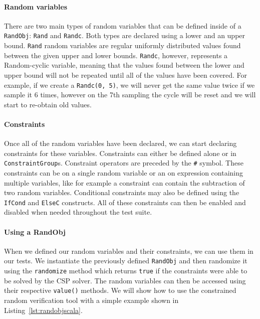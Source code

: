 \documentclass[conference]{IEEEtran}
\begin{document}
\paragraph{Random variables} There are two main types of random variables that can be defined inside of a \texttt{RandObj}: \texttt{Rand} and \texttt{Randc}. Both types are declared using a lower and an upper bound. \texttt{Rand} random variables  are regular uniformly distributed values found between the given upper and lower bounds. \texttt{Randc}, however, represents a Random-cyclic variable, meaning that the values found between the lower and upper bound will not be repeated until all of the values have been covered. For example, if we create a \texttt{Randc(0, 5)}, we will never get the same value twice if we sample it 6 times, however on the 7th sampling the cycle will be reset and we will start to re-obtain old values.

\paragraph{Constraints} Once all of the random variables have been declared, we can start declaring constraints for these variables. Constraints can either be defined alone or in \texttt{ConstraintGroup}s. Constraint operators are preceded by the \texttt{\#} symbol. These constraints can be on a single random variable or an on expression containing multiple variables, like for example a constraint can contain the subtraction of two random variables. Conditional constraints may also be defined using the \texttt{IfCond} and \texttt{ElseC} constructs. All of these constraints can then be enabled and disabled when needed throughout the test suite.

\paragraph{Using a RandObj} When we defined our random variables and their constraints, we can use them in our tests. We instantiate the previously defined \texttt{RandObj} and then randomize it using the \texttt{randomize} method which returns \texttt{true} if the constraints were able to be solved by the CSP solver. The random variables can then be accessed using their respective \texttt{value()} methods. We will show how to use the constrained random verification tool with a simple example shown in Listing~\ref{lst:randobjscala}.

\end{document}
